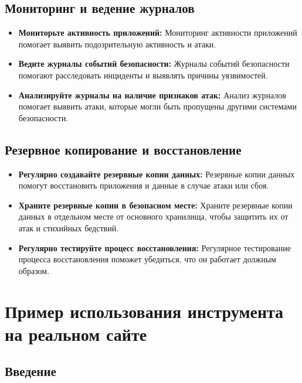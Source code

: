 \documentclass[a4paper,12pt]{diplom}
\begin{document}
	 \subsection{Мониторинг и ведение журналов}
	 
	 \begin{itemize}
	 	\item \textbf{Мониторьте активность приложений:} Мониторинг активности приложений помогает выявить подозрительную активность и атаки. 
	 	\item \textbf{Ведите журналы событий безопасности:} Журналы событий безопасности помогают расследовать инциденты и выявлять причины уязвимостей.
	 	\item \textbf{Анализируйте журналы на наличие признаков атак:} Анализ журналов помогает выявить атаки, которые могли быть пропущены другими системами безопасности.
	 \end{itemize}
	 
	 \subsection{Резервное копирование и восстановление}
	 
	 \begin{itemize}
	 	\item \textbf{Регулярно создавайте резервные копии данных:} Резервные копии данных помогут восстановить приложения и данные в случае атаки или сбоя.
	 	\item \textbf{Храните резервные копии в безопасном месте:} Храните резервные копии данных в отдельном месте от основного хранилища, чтобы защитить их от атак и стихийных бедствий.
	 	\item \textbf{Регулярно тестируйте процесс восстановления:} Регулярное тестирование процесса восстановления поможет убедиться, что он работает должным образом.
	 \end{itemize}
	 
	 
	 
	 
	 
	 
	 
	 
	 
	 
	 
	 \section{Пример использования инструмента на реальном сайте}
	 
	 \subsection{Введение}
	 
\end{document}

